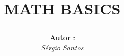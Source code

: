 \begin{titlepage}
	\title{
		\emptyline
		\begin{center}
		 	MATH BASICS
		\end{center}		
	}
	\author{
		\begin{minipage}{1\linewidth}
			\begin{minipage}{0.4\linewidth}
				\flushleft
				\textbf{Autor} : \\
				\emph{S\'{e}rgio Santos} \\ %
			\end{minipage}
			\hspace{0.1\linewidth}
		\end{minipage}
		\minipagespace{2cm}
	}
	\date{}
\end{titlepage}
